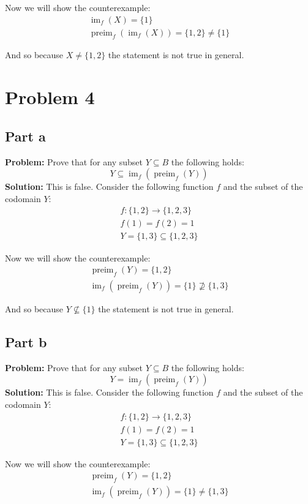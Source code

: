 \documentclass{article}
\begin{document}
Now we will show the counterexample:
\begin{gather*}
  \operatorname{im}_f(X)=\{1\}\\
  \operatorname{preim}_f(\operatorname{im}_f(X))=\{1,2\}\not=\{1\}
\end{gather*}

And so because $X\not=\{1,2\}$ the statement is not true in general.

\section*{Problem 4}
\subsection*{Part a}
\textbf{Problem:} Prove that for any subset $Y\subseteq B$ the following holds:
$$Y\subseteq\operatorname{im}_f(\operatorname{preim}_f(Y))$$
\textbf{Solution:} This is false. Consider the following function $f$ and the subset of the codomain $Y$:
\begin{gather*}
  f:\{1,2\}\to\{1,2,3\}\\
  f(1)=f(2)=1\\
  Y=\{1,3\}\subseteq\{1,2,3\}
\end{gather*}

Now we will show the counterexample:
\begin{gather*}
  \operatorname{preim}_f(Y)=\{1,2\}\\
  \operatorname{im}_f(\operatorname{preim}_f(Y))=\{1\}\not\supseteq\{1,3\}
\end{gather*}

And so because $Y\not\subseteq\{1\}$ the statement is not true in general.

\subsection*{Part b}
\textbf{Problem:} Prove that for any subset $Y\subseteq B$ the following holds:
$$Y=\operatorname{im}_f(\operatorname{preim}_f(Y))$$
\textbf{Solution:} This is false. Consider the following function $f$ and the subset of the codomain $Y$:
\begin{gather*}
  f:\{1,2\}\to\{1,2,3\}\\
  f(1)=f(2)=1\\
  Y=\{1,3\}\subseteq\{1,2,3\}
\end{gather*}

Now we will show the counterexample:
\begin{gather*}
  \operatorname{preim}_f(Y)=\{1,2\}\\
  \operatorname{im}_f(\operatorname{preim}_f(Y))=\{1\}\not=\{1,3\}
\end{gather*}
\end{document}
